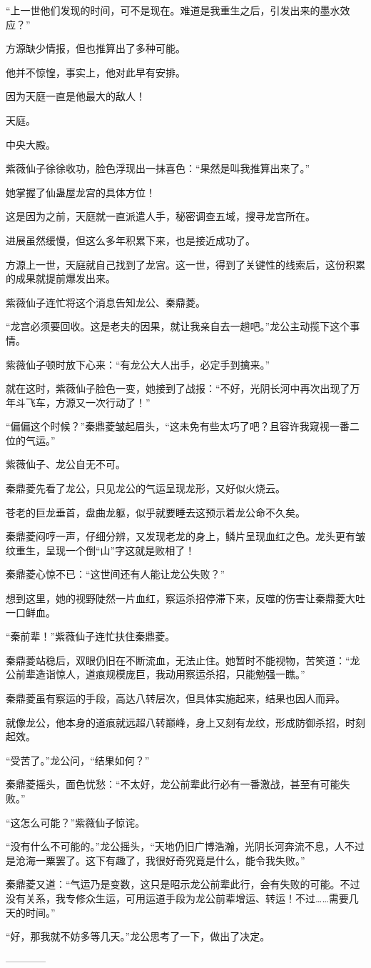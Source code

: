 \begin{this_body}
“上一世他们发现的时间，可不是现在。难道是我重生之后，引发出来的墨水效应？”

方源缺少情报，但也推算出了多种可能。

他并不惊惶，事实上，他对此早有安排。

因为天庭一直是他最大的敌人！

天庭。

中央大殿。

紫薇仙子徐徐收功，脸色浮现出一抹喜色：“果然是叫我推算出来了。”

她掌握了仙蛊屋龙宫的具体方位！

这是因为之前，天庭就一直派遣人手，秘密调查五域，搜寻龙宫所在。

进展虽然缓慢，但这么多年积累下来，也是接近成功了。

方源上一世，天庭就自己找到了龙宫。这一世，得到了关键性的线索后，这份积累的成果就提前爆发出来。

紫薇仙子连忙将这个消息告知龙公、秦鼎菱。

“龙宫必须要回收。这是老夫的因果，就让我亲自去一趟吧。”龙公主动揽下这个事情。

紫薇仙子顿时放下心来：“有龙公大人出手，必定手到擒来。”

就在这时，紫薇仙子脸色一变，她接到了战报：“不好，光阴长河中再次出现了万年斗飞车，方源又一次行动了！”

“偏偏这个时候？”秦鼎菱皱起眉头，“这未免有些太巧了吧？且容许我窥视一番二位的气运。”

紫薇仙子、龙公自无不可。

秦鼎菱先看了龙公，只见龙公的气运呈现龙形，又好似火烧云。

苍老的巨龙垂首，盘曲龙躯，似乎就要睡去这预示着龙公命不久矣。

秦鼎菱闷哼一声，仔细分辨，又发现老龙的身上，鳞片呈现血红之色。龙头更有皱纹重生，呈现一个倒“山”字这就是败相了！

秦鼎菱心惊不已：“这世间还有人能让龙公失败？”

想到这里，她的视野陡然一片血红，察运杀招停滞下来，反噬的伤害让秦鼎菱大吐一口鲜血。

“秦前辈！”紫薇仙子连忙扶住秦鼎菱。

秦鼎菱站稳后，双眼仍旧在不断流血，无法止住。她暂时不能视物，苦笑道：“龙公前辈造诣惊人，道痕规模庞巨，我动用察运杀招，只能勉强一瞧。”

秦鼎菱虽有察运的手段，高达八转层次，但具体实施起来，结果也因人而异。

就像龙公，他本身的道痕就远超八转巅峰，身上又刻有龙纹，形成防御杀招，时刻起效。

“受苦了。”龙公问，“结果如何？”

秦鼎菱摇头，面色忧愁：“不太好，龙公前辈此行必有一番激战，甚至有可能失败。”

“这怎么可能？”紫薇仙子惊诧。

“没有什么不可能的。”龙公摇头，“天地仍旧广博浩瀚，光阴长河奔流不息，人不过是沧海一粟罢了。这下有趣了，我很好奇究竟是什么，能令我失败。”

秦鼎菱又道：“气运乃是变数，这只是昭示龙公前辈此行，会有失败的可能。不过没有关系，我专修众生运，可用运道手段为龙公前辈增运、转运！不过……需要几天的时间。”

“好，那我就不妨多等几天。”龙公思考了一下，做出了决定。

------------

\end{this_body}

